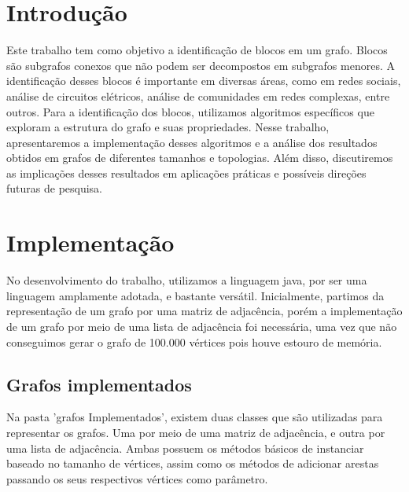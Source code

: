 \section{\esp Introdução}

Este trabalho tem como objetivo a identificação de blocos em um grafo. Blocos são subgrafos conexos que não podem ser decompostos em subgrafos menores. A identificação desses blocos é importante em diversas áreas, como em redes sociais, análise de circuitos elétricos, análise de comunidades em redes complexas, entre outros. Para a identificação dos blocos, utilizamos algoritmos específicos que exploram a estrutura do grafo e suas propriedades. Nesse trabalho, apresentaremos a implementação desses algoritmos e a análise dos resultados obtidos em grafos de diferentes tamanhos e topologias. Além disso, discutiremos as implicações desses resultados em aplicações práticas e possíveis direções futuras de pesquisa.

\section{\esp Implementação}

No desenvolvimento do trabalho, utilizamos a linguagem java, por ser uma linguagem amplamente adotada, e bastante versátil.
Inicialmente, partimos da representação de um grafo por uma matriz de adjacência, porém a implementação de um grafo por meio de uma lista de adjacência foi necessária, uma vez que não conseguimos gerar o grafo de 100.000 vértices pois houve estouro de memória.

\subsection{\esp Grafos implementados}
Na pasta 'grafos Implementados', existem duas classes que são utilizadas para representar os grafos.
Uma por meio de uma matriz de adjacência, e outra por uma lista de adjacência.
Ambas possuem os métodos básicos de instanciar baseado no tamanho de vértices, assim como os métodos de adicionar arestas passando os seus respectivos vértices como parâmetro.
